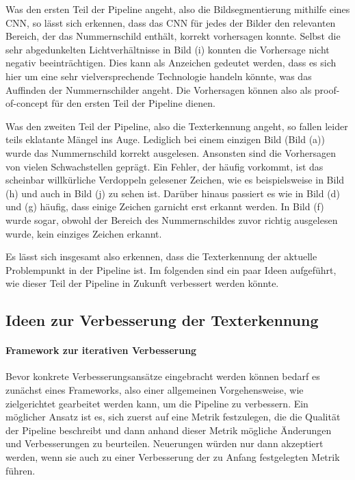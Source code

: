 Was den ersten Teil der Pipeline angeht, also die Bildsegmentierung
mithilfe eines CNN, so l\"asst sich erkennen, dass das CNN f\"ur jedes
der Bilder den relevanten Bereich, der das Nummernschild enth\"alt,
korrekt vorhersagen konnte.
Selbst die sehr abgedunkelten Lichtverh\"altnisse in Bild (i) konnten
die Vorhersage nicht negativ beeintr\"achtigen.
Dies kann als Anzeichen gedeutet werden, dass es sich hier um eine
sehr vielversprechende Technologie handeln k\"onnte, was das Auffinden
der Nummernschilder angeht.
Die Vorhersagen k\"onnen also als proof-of-concept f\"ur den ersten
Teil der Pipeline dienen.

Was den zweiten Teil der Pipeline, also die Texterkennung angeht, so
fallen leider teils eklatante M\"angel ins Auge.
Lediglich bei einem einzigen Bild (Bild (a)) wurde das Nummernschild
korrekt ausgelesen. Ansonsten sind die Vorhersagen von vielen
Schwachstellen gepr\"agt.
Ein Fehler, der h\"aufig vorkommt, ist das scheinbar
willk\"urliche Verdoppeln gelesener Zeichen, wie es beispielsweise
in Bild (h) und auch in Bild (j) zu sehen ist.
Dar\"uber hinaus passiert es wie in Bild (d) und (g) h\"aufig, dass
einige Zeichen garnicht erst erkannt werden.
In Bild (f) wurde sogar, obwohl der Bereich des Nummernschildes zuvor
richtig ausgelesen wurde, kein einziges Zeichen erkannt.

Es l\"asst sich insgesamt also erkennen, dass die Texterkennung
der aktuelle Problempunkt in der Pipeline ist.
Im folgenden sind ein paar Ideen aufgef\"uhrt, wie dieser Teil
der Pipeline in Zukunft verbessert werden k\"onnte.

\subsection{Ideen zur Verbesserung der Texterkennung}
\label{sec:verbesserungen}

\paragraph{Framework zur iterativen Verbesserung}

Bevor konkrete Verbesserungsans\"atze eingebracht werden k\"onnen bedarf
es zun\"achst eines Frameworks, also einer allgemeinen Vorgehensweise,
wie zielgerichtet gearbeitet werden kann, um die Pipeline zu verbessern.
Ein m\"oglicher Ansatz ist es, sich zuerst auf eine Metrik festzulegen,
die die Qualit\"at
der Pipeline beschreibt und dann anhand dieser Metrik m\"ogliche
\"Anderungen und Verbesserungen zu beurteilen.
Neuerungen w\"urden nur dann akzeptiert werden, wenn sie auch zu einer
Verbesserung der zu Anfang festgelegten Metrik f\"uhren.

